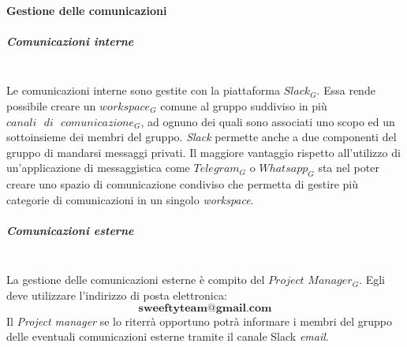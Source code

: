 		\paragraph{Gestione delle comunicazioni}
			\subparagraph{Comunicazioni interne} \mbox{} \\
			\label{comInterne}
			Le comunicazioni interne sono gestite con la piattaforma $Slack_G$. Essa rende possibile creare un $workspace_G$ comune al gruppo suddiviso in più $canali \text{ } di \text{ } comunicazione_G$, ad ognuno dei quali sono associati uno scopo ed un sottoinsieme dei membri del gruppo. \emph{Slack} permette anche a due componenti del gruppo di mandarsi messaggi privati. Il maggiore vantaggio rispetto all'utilizzo di un'applicazione di messaggistica come $Telegram_G$ o $Whatsapp_G$ sta nel poter creare uno spazio di comunicazione condiviso che permetta di gestire più categorie di comunicazioni in un singolo \emph{workspace}. %
			\subparagraph{Comunicazioni esterne} \mbox{} \\
			 La gestione delle comunicazioni esterne è compito del $Project$ $Manager_G$. Egli deve utilizzare l'indirizzo di posta elettronica:
			$$\textbf{sweeftyteam@gmail.com}$$
			Il \emph{Project manager} se lo riterrà opportuno potrà informare i membri del gruppo delle eventuali comunicazioni esterne tramite il canale Slack \emph{email}.
			
